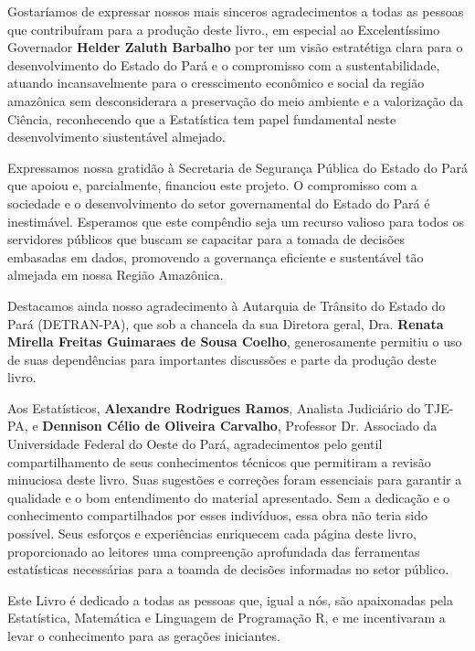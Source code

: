 \begin{refsection}


Gostaríamos de expressar nossos mais sinceros agradecimentos a todas as pessoas que contribuíram para a produção deste livro., em especial ao Excelentíssimo Governador \textbf{Helder Zaluth Barbalho} por ter um visão estratétiga clara para o desenvolvimento do Estado do Pará e o compromisso com a sustentabilidade, atuando incansavelmente para o cresscimento econômico e social da região amazônica sem desconsiderara a preservação do meio ambiente e a valorização da Ciência, reconhecendo que a Estatística tem papel fundamental neste desenvolvimento siustentável almejado.\vst

Expressamos nossa gratidão à Secretaria de Segurança Pública do Estado do Pará que apoiou e, parcialmente, financiou este projeto. O compromisso com a sociedade e o desenvolvimento do setor governamental do Estado do Pará é inestimável. Esperamos que este compêndio seja um recurso valioso para todos os servidores públicos que buscam se capacitar para a tomada de decisões embasadas em dados, promovendo a governança eficiente e sustentável tão almejada em nossa Região Amazônica.\vst

Destacamos ainda nosso agradecimento à Autarquia de Trânsito do Estado do Pará (DETRAN-PA), que sob a chancela da sua Diretora geral, Dra. \textbf{Renata Mirella Freitas Guimaraes de Sousa Coelho}, generosamente permitiu o uso de suas dependências para importantes discussões e parte da produção deste livro.
\vst

Aos Estatísticos, \textbf{Alexandre Rodrigues Ramos}, Analista Judiciário do TJE-PA, e \textbf{Dennison Célio de Oliveira Carvalho}, Professor Dr. Associado da Universidade Federal do Oeste do Pará, agradecimentos pelo gentil compartilhamento de seus conhecimentos técnicos que permitiram a revisão minuciosa deste livro. Suas sugestões e correções foram essenciais para garantir a qualidade e o bom entendimento do material apresentado. Sem a dedicação e o conhecimento compartilhados por esses indivíduos, essa obra não teria sido possível. Seus esforços e experiências enriquecem cada página deste livro, proporcionado ao leitores uma compreenção aprofundada das ferramentas estatísticas necessárias para a toamda de decisões informadas no setor público.

\newpage

Este Livro é dedicado a todas as pessoas que, igual a nós, são apaixonadas pela Estatística, Matemática e Linguagem de Programação R, e me incentivaram a levar o conhecimento para as gerações iniciantes.
\vst







\printbibliography[heading=subbibliography]
\end{refsection}






